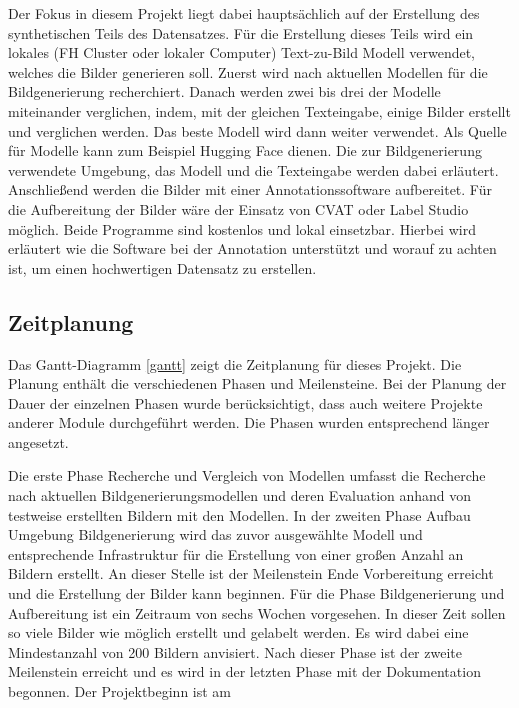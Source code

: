 Der Fokus in diesem Projekt liegt dabei hauptsächlich auf der Erstellung des synthetischen Teils des Datensatzes. Für die Erstellung dieses Teils wird ein lokales (FH Cluster oder lokaler Computer) Text-zu-Bild Modell verwendet, welches die Bilder generieren soll. Zuerst wird nach aktuellen Modellen für die Bildgenerierung recherchiert. Danach werden zwei bis drei der Modelle miteinander verglichen, indem, mit der gleichen Texteingabe, einige Bilder erstellt und verglichen werden. Das beste Modell wird dann weiter verwendet. Als Quelle für Modelle kann zum Beispiel Hugging Face \cite{huggingface2025} dienen. Die zur Bildgenerierung verwendete Umgebung, das Modell und die Texteingabe werden dabei erläutert. Anschlie{\ss}end werden die Bilder mit einer Annotationssoftware aufbereitet. Für die Aufbereitung der Bilder wäre der Einsatz von CVAT \cite{cvat2025} oder Label Studio \cite{labelimg2025} möglich. Beide Programme sind kostenlos und lokal einsetzbar. Hierbei wird erläutert wie die Software bei der Annotation unterstützt und worauf zu achten ist, um einen hochwertigen Datensatz zu erstellen.

\subsection{Zeitplanung}
Das Gantt-Diagramm \ref{gantt} zeigt die Zeitplanung für dieses Projekt. Die Planung enthält die verschiedenen Phasen und Meilensteine. Bei der Planung der Dauer der einzelnen Phasen wurde berücksichtigt, dass auch weitere Projekte anderer Module durchgeführt werden. Die Phasen wurden entsprechend länger angesetzt.
	
	Die erste Phase Recherche und Vergleich von Modellen umfasst die Recherche nach aktuellen Bildgenerierungsmodellen und deren Evaluation anhand von testweise erstellten Bildern mit den Modellen. In der zweiten Phase Aufbau Umgebung Bildgenerierung wird das zuvor ausgewählte Modell und entsprechende Infrastruktur für die Erstellung von einer gro{\ss}en Anzahl an Bildern erstellt. An dieser Stelle ist der Meilenstein Ende Vorbereitung erreicht und die Erstellung der Bilder kann beginnen. Für die Phase Bildgenerierung und Aufbereitung ist ein Zeitraum von sechs Wochen vorgesehen. In dieser Zeit sollen so viele Bilder wie möglich erstellt und gelabelt werden. Es wird dabei eine Mindestanzahl von 200 Bildern anvisiert. Nach dieser Phase ist der zweite Meilenstein erreicht und es wird in der letzten Phase mit der Dokumentation begonnen. Der Projektbeginn ist am 
	
